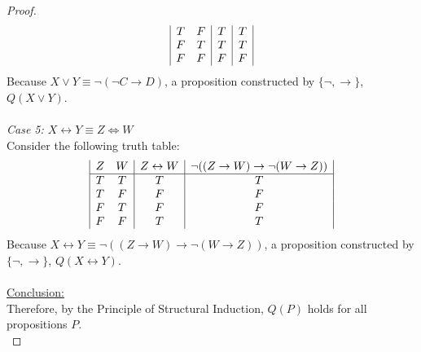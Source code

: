 \documentclass[12pt]{article}
\begin{document}
\begin{proof}
\begin{displaymath}
\begin{array}{|c c|c|c|}
            T & F & T & T \\
            F & T & T & T \\
            F & F & F & F \\
        \end{array}
    \end{displaymath}
    Because $X \lor Y \equiv \neg(\neg C \rightarrow D)$, a proposition constructed by $\{\neg, \rightarrow\}$, $Q(X \lor Y)$. \\
    \\
    \textit{Case 5: $X \leftrightarrow Y \equiv Z \iff W$} \\
    Consider the following truth table: \\
        \begin{displaymath}
        \begin{array}{|c c|c|c|}  %
            Z & W & Z \leftrightarrow W & \neg ((Z \rightarrow W) \rightarrow \neg (W \rightarrow Z)) \\ %
            \hline %
            T & T & T & T \\
            T & F & F & F \\
            F & T & F & F \\
            F & F & T & T \\
        \end{array}
    \end{displaymath}
    Because $X \leftrightarrow Y \equiv \neg ((Z \rightarrow W) \rightarrow \neg (W \rightarrow Z))$, a proposition constructed by $\{\neg, \rightarrow\}$, $Q(X \leftrightarrow Y)$. \\
    \\
    \underline{Conclusion:} \\
    Therefore, by the Principle of Structural Induction, $Q(P)$ holds for all propositions $P$. \\
\end{proof}
\end{document}
